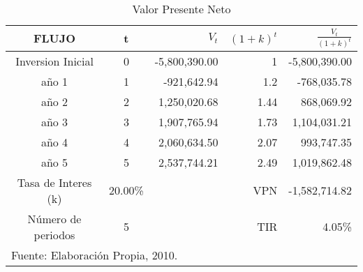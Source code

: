 \begin{table}
    \caption{Valor Presente Neto}
    \label{tbl:VPN}
    \centering
    \begin{tabular}{c|c|r|r|r}
        FLUJO               & t & $V_t$         & $\left(1+k\right)^t$ & $\frac{V_t}{\left(1+k\right)^t}$ \\
        \hline
        \hline
        Inversion Inicial   & 0 & -5,800,390.00 & 1                    &  -5,800,390.00                   \\
        \hline
        año 1               & 1 & -921,642.94   & 1.2                  &  -768,035.78                     \\
        año 2               & 2 & 1,250,020.68  & 1.44                 &  868,069.92                      \\
        año 3               & 3 & 1,907,765.94  & 1.73                 &  1,104,031.21                    \\
        año 4               & 4 & 2,060,634.50  & 2.07                 &  993,747.35                      \\
        año 5               & 5 & 2,537,744.21  & 2.49                 &  1,019,862.48                    \\
        \hline
        Tasa de Interes (k) &  20.00\% &        & VPN                  &  -1,582,714.82                   \\
        Número de periodos  & 5 &               & TIR                  &  4.05\%                          \\
        \hline
        \multicolumn{5}{l}{\footnotesize Fuente: Elaboración Propia, 2010.}
    \end{tabular}
\end{table}











